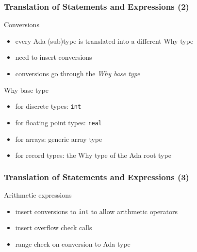 \documentclass{beamer}
\newenvironment{specialframe}{%
  \begin{frame}[fragile,environment=specialframe]}{\end{frame}}
\begin{document}
\begin{specialframe}\frametitle{Translation of Statements and Expressions (2)}
   \begin{block}{Conversions}
      \begin{itemize}
         \item every Ada (sub)type is translated into a different Why type
         \item need to insert conversions
         \item conversions go through the \emph{Why base type}
      \end{itemize}
   \end{block}
   \begin{block}{Why base type}
      \begin{itemize}
         \item for discrete types: \verb|int|
         \item for floating point types: \verb|real|
         \item for arrays: generic array type
         \item for record types: the Why type of the Ada root type
      \end{itemize}
   \end{block}
\end{specialframe}

\begin{specialframe}\frametitle{Translation of Statements and Expressions (3)}
   \begin{block}{Arithmetic expressions}
      \begin{itemize}
         \item insert conversions to \verb|int| to allow arithmetic operators
         \item insert overflow check calls
         \item range check on conversion to Ada type
      \end{itemize}
   \end{block}
\end{specialframe}
\end{document}
